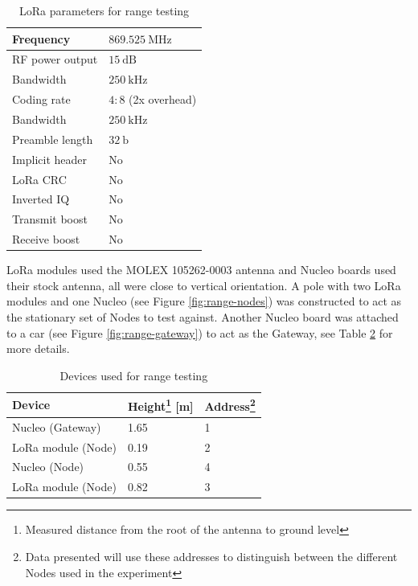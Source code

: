 \begin{table}[H]
\begin{center}
\caption{\label{table:range-test-parameters}LoRa parameters for range testing}
    \begin{tabular}{|l|l|} \hline
    Frequency             & $869.525~\mathrm{MHz}$\\ \hline
    RF power output       & $15~\mathrm{dB}$\\ \hline
    Bandwidth             & $250~\mathrm{kHz}$\\ \hline
    Coding rate           & $4:8$ (2x overhead) \\ \hline
    Bandwidth             & $250~\mathrm{kHz}$\\ \hline
    Preamble length       & $32~\mathrm{b}$\\ \hline
    Implicit header       & No\\ \hline
    LoRa CRC              & No\\ \hline
    Inverted IQ           & No\\ \hline
    Transmit boost        & No\\ \hline
    Receive boost         & No\\ \hline
    \end{tabular}
\end{center}
\end{table}

LoRa modules used the MOLEX 105262-0003 antenna and Nucleo boards used their stock antenna, all were close to vertical orientation. A pole with two LoRa modules and one Nucleo (see Figure \ref{fig:range-nodes}) was constructed to act as the stationary set of Nodes to test against. Another Nucleo board was attached to a car (see Figure \ref{fig:range-gateway}) to act as the Gateway, see Table \ref{table:range-test-devices} for more details.

\begin{table}[H]
\begin{center}
\caption{\label{table:range-test-devices}Devices used for range testing}
    \begin{tabular}{|l|l|l|} \hline
    \textbf{Device} & \textbf{Height\footnote{Measured distance from the root of the antenna to ground level} [m]} & \textbf{Address}\footnote{Data presented will use these addresses to distinguish between the different Nodes used in the experiment} \\ \hline
    Nucleo (Gateway) & 1.65 & 1 \\ \hline
    LoRa module (Node) & 0.19 & 2 \\ \hline
    Nucleo (Node) & 0.55 & 4 \\ \hline
    LoRa module (Node) & 0.82 & 3 \\ \hline
    \end{tabular}
\end{center}
\end{table}

